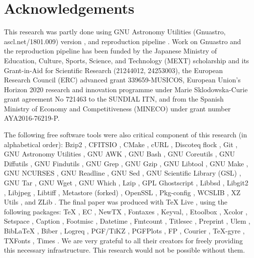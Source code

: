 \documentclass[10pt, twocolumn]{article}
\begin{document}
\section{Acknowledgements}

This research was partly done using GNU Astronomy Utilities (Gnuastro,
ascl.net/1801.009) version \gnuastroversion, and reproduction pipeline
\pipelineversion. Work on Gnuastro and the reproduction pipeline has been
funded by the Japanese Ministry of Education, Culture, Sports, Science, and
Technology (MEXT) scholarship and its Grant-in-Aid for Scientific Research
(21244012, 24253003), the European Research Council (ERC) advanced grant
339659-MUSICOS, European Union’s Horizon 2020 research and innovation
programme under Marie Sklodowska-Curie grant agreement No 721463 to the
SUNDIAL ITN, and from the Spanish Ministry of Economy and Competitiveness
(MINECO) under grant number AYA2016-76219-P.

The following free software tools were also critical component of this
research (in alphabetical order): Bzip2 \bziptwoversion, CFITSIO
\cfitsioversion, CMake \cmakeversion, cURL \curlversion, Discoteq flock
\flockversion, Git \gitversion, GNU Astronomy Utilities \gnuastroversion,
GNU AWK \gawkversion, GNU Bash \bashversion, GNU Coreutils
\coreutilsversion, GNU Diffutils \diffutilsversion, GNU Findutils
\findutilsversion, GNU Grep \grepversion, GNU Gzip \gzipversion, GNU
Libtool \libtoolversion, GNU Make \makeversion, GNU NCURSES
\ncursesversion, GNU Readline \readlineversion, GNU Sed \sedversion, GNU
Scientific Library (GSL) \gslversion, GNU Tar \tarversion, GNU Wget
\wgetversion, GNU Which \whichversion, Lzip \lzipversion, GPL Ghostscript
\ghostscriptversion, Libbsd \libbsdversion, Libgit2 \libgitwoversion,
Libjpeg \libjpegversion, Libtiff \libtiffversion, Metastore (forked)
\metastoreversion, OpenSSL \opensslversion, Pkg-config \pkgconfigversion,
WCSLIB \wcslibversion, XZ Utils \xzversion, and ZLib \zlibversion. The
final paper was produced with \TeX{} Live \texliveversion, using the
following packages: \TeX{} \textexversion, EC \texecversion, NewTX
\texnewtxversion, Fontaxes \texfontaxesversion, Keyval, \texxkeyvalversion,
Etoolbox \texetoolboxversion, Xcolor \texxcolorversion, Setspace
\texsetspaceversion, Caption \texcaptionversion, Footmisc
\texfootmiscversion, Datetime \texdatetimeversion, Fmtcount
\texfmtcountversion, Titlesec \textitlesecversion, Preprint
\texpreprintversion, Ulem \texulemversion, Bib\LaTeX{} \texbiblatexversion,
Biber \texbiberversion, Logreq \texlogreqversion, PGF/TiKZ \texpgfversion,
PGFPlots \texpgfplotsversion, FP \texfpversion, Courier \texcourierversion,
\TeX-gyre \textexgyreversion, TXFonts \textxfontsversion, Times
\textimesversion. We are very grateful to all their creators for freely
providing this necessary infrastructure. This research would not be
possible without them.

\printbibliography

\end{document}
